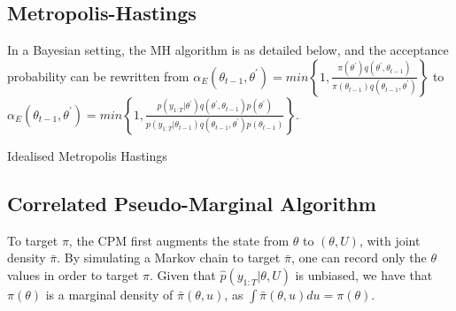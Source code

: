 \documentclass{article}
\makeatletter
\def\BState{\State\hskip-\ALG@thistlm}
\makeatother
\begin{document}
\subsection{Metropolis-Hastings}
In a Bayesian setting, the MH algorithm is as detailed below, and the acceptance probability can be rewritten from $\alpha_E(\theta_{t-1}, \theta^\prime) = min\left\{1,  \frac{
                \pi(\theta^\prime) q(\theta^\prime, \theta_{t-1})}
                {\pi(\theta_{t-1}) q(\theta_{t-1}, \theta^\prime)}\right\}$ to
 $ \alpha_E(\theta_{t-1}, \theta^\prime) = min\left\{1,  \frac{
                p(y_{1:T}| \theta^\prime) q(\theta^\prime, \theta_{t-1})p(\theta^\prime)}
                {p(y_{1:T}| \theta_{t-1}) q(\theta_{t-1}, \theta^\prime)p(\theta_{t-1})}
\right\} $.

\begin{algorithm}[H]
\caption{Idealised Metropolis Hastings}\label{euclid}
\end{algorithm}


\subsection{Correlated Pseudo-Marginal Algorithm}
To target $\pi$, the CPM first augments the state from $\theta$ to $(\theta, U)$, with joint density $\bar{\pi}$. By simulating a Markov chain to target $\bar{\pi}$, one can record only the $\theta$ values in order to target $\pi$. Given that $\hat{p} (y_{1:T} | \theta, U)$ is unbiased, we have that $\pi(\theta)$ is a marginal density of $\bar{\pi} (\theta, u)$, as $\int \bar{\pi}(\theta,u)du = \pi(\theta)$. \\
\end{document}
